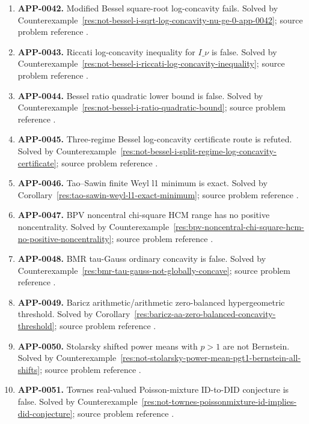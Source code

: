 \documentclass[11pt]{article}
\numberwithin{equation}{section}
\theoremstyle{definition}
\theoremstyle{remark}
\newcommand{\1}{\mathbf 1}
\begin{document}
\begin{enumerate}
\item \label{ledger:app-0042}\textbf{APP-0042.} Modified Bessel square-root log-concavity fails. Solved by Counterexample~\ref{res:not-bessel-i-sqrt-log-concavity-nu-ge-0-app-0042}; source problem reference \cite{app-app-0042-source}.
\item \label{ledger:app-0043}\textbf{APP-0043.} Riccati log-concavity inequality for \(I\_\nu\) is false. Solved by Counterexample~\ref{res:not-bessel-i-riccati-log-concavity-inequality}; source problem reference \cite{app-app-0042-source}.
\item \label{ledger:app-0044}\textbf{APP-0044.} Bessel ratio quadratic lower bound is false. Solved by Counterexample~\ref{res:not-bessel-i-ratio-quadratic-bound}; source problem reference \cite{app-app-0042-source}.
\item \label{ledger:app-0045}\textbf{APP-0045.} Three-regime Bessel log-concavity certificate route is refuted. Solved by Counterexample~\ref{res:not-bessel-i-split-regime-log-concavity-certificate}; source problem reference \cite{app-app-0042-source}.
\item \label{ledger:app-0046}\textbf{APP-0046.} Tao--Sawin finite Weyl l1 minimum is exact. Solved by Corollary~\ref{res:tao-sawin-weyl-l1-exact-minimum}; source problem reference \cite{app-app-0046-source}.
\item \label{ledger:app-0047}\textbf{APP-0047.} BPV noncentral chi-square HCM range has no positive noncentrality. Solved by Counterexample~\ref{res:bpv-noncentral-chi-square-hcm-no-positive-noncentrality}; source problem reference \cite{app-app-0047-source}.
\item \label{ledger:app-0048}\textbf{APP-0048.} BMR tau-Gauss ordinary concavity is false. Solved by Counterexample~\ref{res:bmr-tau-gauss-not-globally-concave}; source problem reference \cite{app-app-0048-source}.
\item \label{ledger:app-0049}\textbf{APP-0049.} Baricz arithmetic/arithmetic zero-balanced hypergeometric threshold. Solved by Corollary~\ref{res:baricz-aa-zero-balanced-concavity-threshold}; source problem reference \cite{app-app-0049-source}.
\item \label{ledger:app-0050}\textbf{APP-0050.} Stolarsky shifted power means with \(p>1\) are not Bernstein. Solved by Counterexample~\ref{res:not-stolarsky-power-mean-pgt1-bernstein-all-shifts}; source problem reference \cite{app-app-0050-source}.
\item \label{ledger:app-0051}\textbf{APP-0051.} Townes real-valued Poisson-mixture ID-to-DID conjecture is false. Solved by Counterexample~\ref{res:not-townes-poissonmixture-id-implies-did-conjecture}; source problem reference \cite{app-app-0051-source}.

\end{enumerate}
\end{document}
